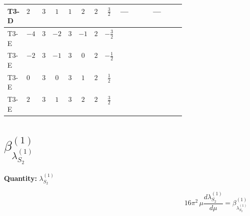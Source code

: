 \documentclass[8pt]{article}
\begin{document}
\begin{landscape}
\begin{longtable}{@{}llcccccc >{\raggedright\arraybackslash}p{0.21\linewidth} >{\raggedright\arraybackslash}p{0.21\linewidth}@{}}
\midrule
T3-D & $2$ & $3$ & $1$ & $1$ & $2$ & $2$ & $\frac{3}{2}$ & --- & --- \\
\midrule
T3-E & $-4$ & $3$ & $-2$ & $3$ & $-1$ & $2$ & $-\frac{3}{2}$ & \scriptsize\adjustbox{max width=\linewidth}{$\begin{gathered} +6 {\lambda_{12}^{(A)}}^2\end{gathered}$} & \scriptsize\adjustbox{max width=\linewidth}{$\begin{gathered} +6 {\lambda_{12}^{(\times)}}^2\end{gathered}$} \\
\midrule
T3-E & $-2$ & $3$ & $-1$ & $3$ & $0$ & $2$ & $-\frac{1}{2}$ & \scriptsize\adjustbox{max width=\linewidth}{$\begin{gathered} +6 {\lambda_{12}^{(A)}}^2\end{gathered}$} & \scriptsize\adjustbox{max width=\linewidth}{$\begin{gathered} +6 {\lambda_{12}^{(\times)}}^2\end{gathered}$} \\
\midrule
T3-E & $0$ & $3$ & $0$ & $3$ & $1$ & $2$ & $\frac{1}{2}$ & \scriptsize\adjustbox{max width=\linewidth}{$\begin{gathered} +6 {\lambda_{12}^{(A)}}^2\end{gathered}$} & \scriptsize\adjustbox{max width=\linewidth}{$\begin{gathered} +6 {\lambda_{12}^{(\times)}}^2\end{gathered}$} \\
\midrule
T3-E & $2$ & $3$ & $1$ & $3$ & $2$ & $2$ & $\frac{3}{2}$ & \scriptsize\adjustbox{max width=\linewidth}{$\begin{gathered} +6 {\lambda_{12}^{(A)}}^2\end{gathered}$} & \scriptsize\adjustbox{max width=\linewidth}{$\begin{gathered} +6 {\lambda_{12}^{(\times)}}^2\end{gathered}$} \\
\midrule
\bottomrule
\end{longtable}
\clearpage
\section*{$\beta_{\lambda_{S_2}^{(1)}}^{(1)}$}
\noindent\textbf{Quantity: }$\lambda_{S_2}^{(1)}$\par\smallskip
\[16\pi^2\,\mu\frac{d \lambda_{S_2}^{(1)}}{d\mu}=\beta_{\lambda_{S_2}^{(1)}}^{(1)}\]

\end{landscape}
\end{document}
